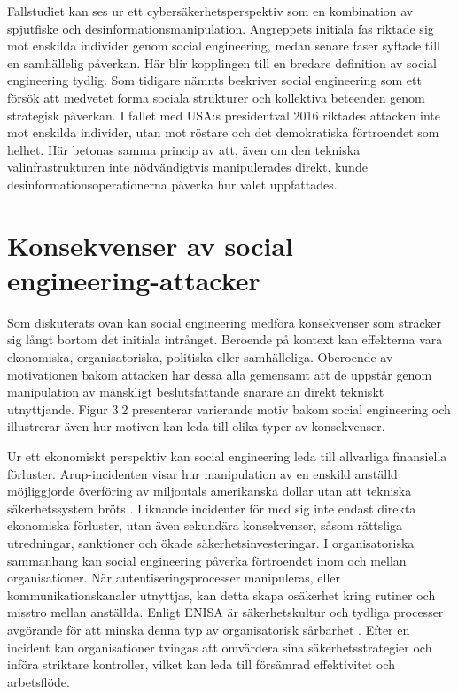 Fallstudiet kan ses ur ett cybersäkerhetsperspektiv som en kombination av spjutfiske och desinformationsmanipulation. Angreppets initiala fas riktade sig mot enskilda individer genom social engineering, medan senare 
faser syftade till en samhällelig påverkan. Här blir kopplingen till en bredare definition av social engineering tydlig. Som tidigare nämnts beskriver \cite{podgorecki1998social} social engineering som ett försök att 
medvetet forma sociala strukturer och kollektiva beteenden genom strategisk påverkan. I fallet med USA:s presidentval 2016 riktades attacken inte mot enskilda individer, utan mot röstare och det demokratiska förtroendet som helhet. 
Här betonas samma princip av \cite{fiia2016election_hacking} att, även om den tekniska valinfrastrukturen inte nödvändigtvis manipulerades direkt, kunde desinformationsoperationerna påverka hur valet uppfattades.



\section{Konsekvenser av social engineering-attacker}
Som diskuterats ovan kan social engineering medföra konsekvenser som sträcker sig långt bortom det initiala intrånget. Beroende på kontext kan effekterna vara ekonomiska, organisatoriska, politiska eller samhälleliga. 
Oberoende av motivationen bakom attacken har dessa alla gemensamt att de uppstår genom manipulation av mänskligt beslutsfattande snarare än direkt tekniskt utnyttjande.
Figur 3.2 presenterar varierande motiv bakom social engineering och illustrerar även hur motiven kan leda till olika typer av konsekvenser. 

Ur ett ekonomiskt perspektiv kan social engineering leda till allvarliga finansiella förluster. Arup-incidenten visar hur manipulation av en enskild anställd möjliggjorde överföring av miljontals amerikanska dollar 
utan att tekniska säkerhetssystem bröts \cite{bbc_arup_2024, guardian_arup_2024}. Liknande incidenter för med sig inte endast direkta ekonomiska förluster, utan även sekundära konsekvenser, såsom rättsliga utredningar, 
sanktioner och ökade säkerhetsinvesteringar. I organisatoriska sammanhang kan social engineering påverka förtroendet inom och mellan organisationer. När autentiseringsprocesser manipuleras, eller kommunikationskanaler utnyttjas, 
kan detta skapa osäkerhet kring rutiner och misstro mellan anställda. Enligt ENISA är säkerhetskultur och tydliga processer avgörande för att minska denna typ av organisatorisk sårbarhet \cite{enisa2018cybersecurity_culture}. 
Efter en incident kan organisationer tvingas att omvärdera sina säkerhetsstrategier och införa striktare kontroller, vilket kan leda till försämrad effektivitet och arbetsflöde. 

